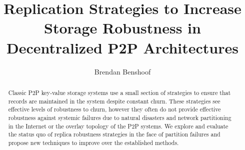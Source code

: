 \documentclass[conference]{IEEEtran}
\title{Replication Strategies to Increase Storage Robustness in Decentralized P2P Architectures}
\author{Brendan Benshoof}
\begin{document}
\maketitle

%
%



%













\begin{abstract}
Classic P2P key-value storage systems use a small section of strategies to ensure that records are maintained in the system despite constant churn.
These strategies see effective levels of robustness to churn, however they often do not provide effective robustness against systemic failures due to natural disasters and network partitioning in the Internet or the overlay topology of the P2P systems.
We explore and evaluate the status quo of replica robustness strategies in the face of partition failures and propose new techniques to improve over the established methods.
\end{abstract}
\end{document}

